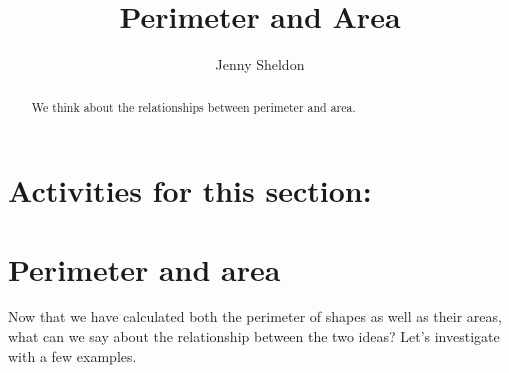 \documentclass{ximera}
\title{Perimeter and Area}
\author{Jenny Sheldon}
\begin{document}
\begin{abstract}
We think about the relationships between perimeter and area.
\end{abstract}
\maketitle

\section{Activities for this section:} 

\section{Perimeter and area}

Now that we have calculated both the perimeter of shapes as well as their areas, what can we say about the relationship between the two ideas? Let's investigate with a few examples.
\end{document}

